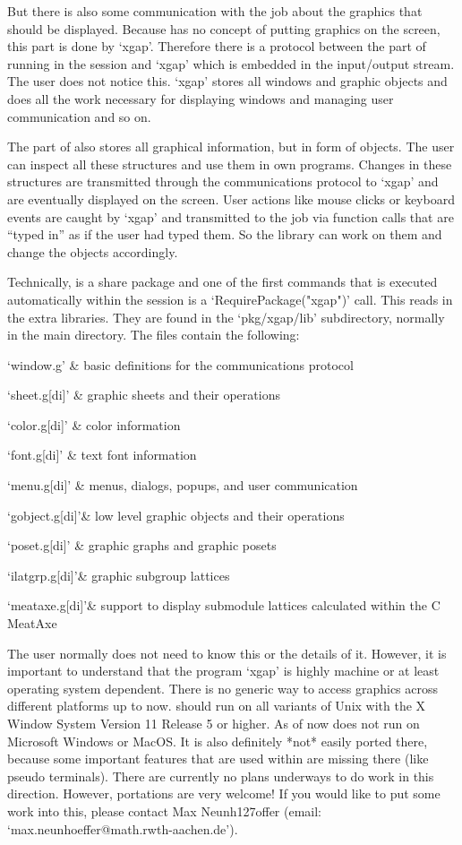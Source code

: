 But there is also some communication with the {\GAP} job about the graphics
that should be displayed. Because {\GAP} has no concept of putting graphics
on the screen, this part is done by `xgap'. Therefore there is a protocol
between the {\GAP} part of {\XGAP} running in the {\GAP} session and `xgap' 
which is embedded in the input/output stream. The user does not notice
this. `xgap' stores all windows and graphic objects and does all the work
necessary for displaying windows and managing user communication and so on.

The {\GAP} part of {\XGAP} also stores all graphical information, but in
form of {\GAP} objects. The user can inspect all these structures and use
them in own programs. Changes in these structures are transmitted through
the communications protocol to `xgap' and are eventually displayed on the
screen. User actions like mouse clicks or keyboard events are caught by
`xgap' and transmitted to the {\GAP} job via function calls that are
``typed in'' as if the user had typed them. So the library can work on them 
and change the {\GAP} objects accordingly.

Technically, {\XGAP} is a share package and one of the first commands that
is executed automatically within the {\GAP} session is a
`RequirePackage("xgap")' call. This reads in the extra {\XGAP}
libraries. They are found in the `pkg/xgap/lib' subdirectory, normally in the
main {\GAP} directory. The files contain the following:

\beginitems
`window.g' & basic definitions for the communications protocol

`sheet.g[di]' & graphic sheets and their operations 

`color.g[di]' & color information

`font.g[di]'  & text font information

`menu.g[di]'  & menus, dialogs, popups, and user communication

`gobject.g[di]'& low level graphic objects and their operations

`poset.g[di]' & graphic graphs and graphic posets

`ilatgrp.g[di]'& graphic subgroup lattices

`meataxe.g[di]'& support to display submodule lattices calculated within
the C MeatAxe
\enditems

The user normally does not need to know this or the details of it. However, 
it is important to understand that the program `xgap' is highly machine or
at least operating system dependent. There is no generic way to access
graphics across different platforms up to now. {\XGAP} should run on all
variants of Unix with the X Window System Version 11 Release 5 or
higher. As of now {\XGAP} does not run on Microsoft Windows or MacOS. It is 
also definitely *not* easily ported there, because some important features
that are used within {\XGAP} are missing there (like pseudo terminals).
There are currently no plans underways to do work in this direction.
However, portations are very welcome! If you would like to put some work
into this, please contact Max Neunh\accent127offer (email:
`max.neunhoeffer@math.rwth-aachen.de'). 

